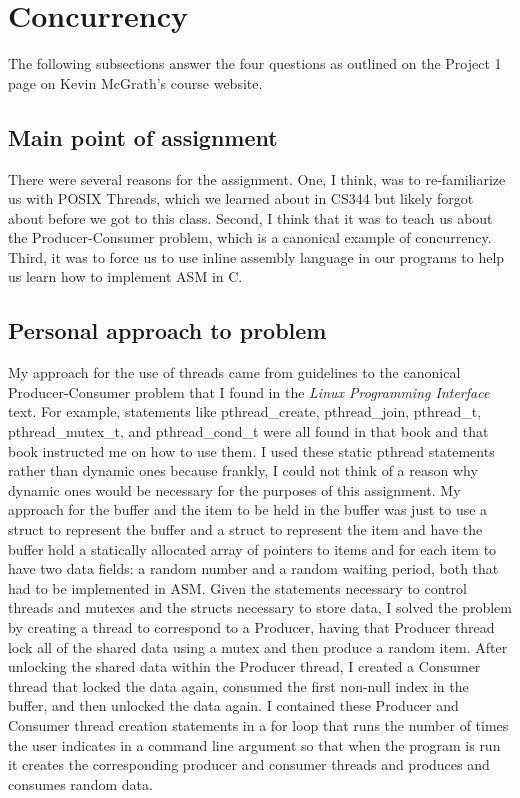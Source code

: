 \documentclass[letterpaper,10pt,titlepage]{article}
\begin{document}
\section{Concurrency}
The following subsections answer the four questions as outlined on the Project 1 page on Kevin McGrath's course website.
\subsection{Main point of assignment}
There were several reasons for the assignment. One, I think, was to re-familiarize us with POSIX Threads, which we learned about in CS344 but likely forgot about before we got to this class. Second, I think that it was to teach us about the Producer-Consumer problem, which is a canonical example of concurrency. Third, it was to force us to use inline assembly language in our programs to help us learn how to implement ASM in C.
\subsection{Personal approach to problem}
My approach for the use of threads came from guidelines to the canonical Producer-Consumer problem that I found in the \emph{Linux Programming Interface} text. For example, statements like pthread\_create, pthread\_join, pthread\_t, pthread\_mutex\_t, and pthread\_cond\_t were all found in that book and that book instructed me on how to use them. I used these static pthread statements rather than dynamic ones because frankly, I could not think of a reason why dynamic ones would be necessary for the purposes of this assignment. My approach for the buffer and the item to be held in the buffer was just to use a struct to represent the buffer and a struct to represent the item and have the buffer hold a statically allocated array of pointers to items and for each item to have two data fields: a random number and a random waiting period, both that had to be implemented in ASM. Given the statements necessary to control threads and mutexes and the structs necessary to store data, I solved the problem by creating a thread to correspond to a Producer, having that Producer thread lock all of the shared data using a mutex and then produce a random item. After unlocking the shared data within the Producer thread, I created a Consumer thread that locked the data again, consumed the first non-null index in the buffer, and then unlocked the data again. I contained these Producer and Consumer thread creation statements in a for loop that runs the number of times the user indicates in a command line argument so that when the program is run it creates the corresponding producer and consumer threads and produces and consumes random data. 
\end{document}
